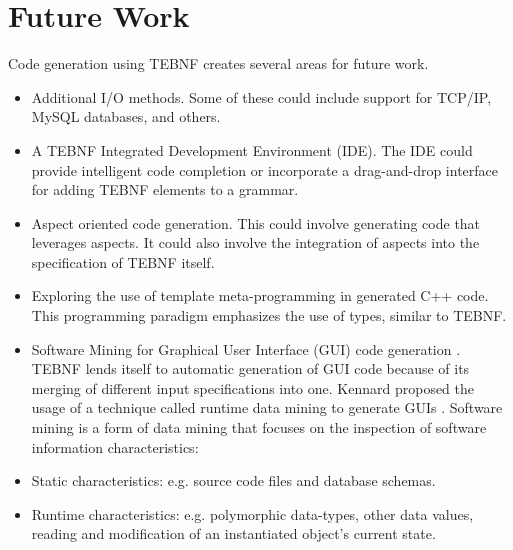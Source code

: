\chapter{Future Work}
Code generation using TEBNF creates several areas for future work.
\begin{itemize}
  \item Additional I/O methods.  Some of these could include support for TCP/IP, MySQL databases, and others.
  \item A TEBNF Integrated Development Environment (IDE).  The IDE could provide intelligent code completion or incorporate a drag-and-drop interface for adding TEBNF elements to a grammar.
  \item Aspect oriented code generation.  This could involve generating code that leverages aspects.  It could also involve the integration of aspects into the specification of TEBNF itself.
  \item Exploring the use of template meta-programming in generated C++ code.  This programming paradigm emphasizes the use of types, similar to TEBNF.
  \item Software Mining for Graphical User Interface (GUI) code generation \cite{kennard_01,kennard_02}.  TEBNF lends itself to automatic generation of GUI code because of its merging of different input specifications into one.   Kennard proposed the usage of a technique called runtime data mining to generate GUIs \cite{kennard_01}.  Software mining \cite{kennard_02} is a form of data mining that focuses on the inspection of software information characteristics:
  \item Static characteristics: e.g. source code files and database schemas.
  \item Runtime characteristics: e.g. polymorphic data-types, other data values, reading and modification of an instantiated object’s current state.
\end{itemize}